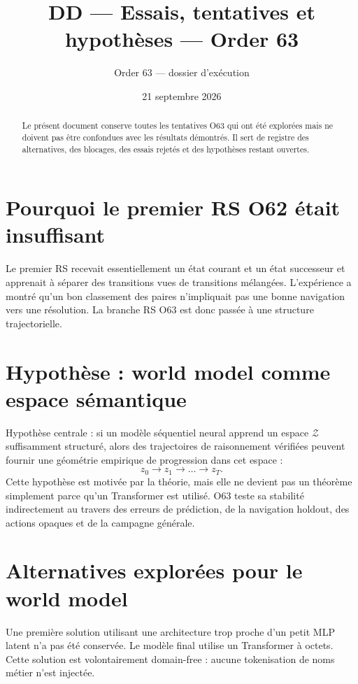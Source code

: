 \documentclass[11pt,a4paper]{article}
\newcommand{\Z}{\mathcal{Z}}
\begin{document}
\title{DD — Essais, tentatives et hypothèses — Order 63}\author{Order 63 — dossier d’exécution}\date{21 septembre 2026}\maketitle

\begin{abstract}
Le présent document conserve toutes les tentatives O63 qui ont été explorées mais ne doivent pas être confondues avec les résultats démontrés. Il sert de registre des alternatives, des blocages, des essais rejetés et des hypothèses restant ouvertes.
\end{abstract}

\section{Pourquoi le premier RS O62 était insuffisant}
Le premier RS recevait essentiellement un état courant et un état successeur et apprenait à séparer des transitions vues de transitions mélangées. L’expérience a montré qu’un bon classement des paires n’impliquait pas une bonne navigation vers une résolution. La branche RS O63 est donc passée à une structure trajectorielle.

\section{Hypothèse : world model comme espace sémantique}
Hypothèse centrale : si un modèle séquentiel neural apprend un espace $\Z$ suffisamment structuré, alors des trajectoires de raisonnement vérifiées peuvent fournir une géométrie empirique de progression dans cet espace :
\[
z_0\to z_1\to\dots\to z_T.
\]
Cette hypothèse est motivée par la théorie, mais elle ne devient pas un théorème simplement parce qu’un Transformer est utilisé. O63 teste sa stabilité indirectement au travers des erreurs de prédiction, de la navigation holdout, des actions opaques et de la campagne générale.

\section{Alternatives explorées pour le world model}
Une première solution utilisant une architecture trop proche d’un petit MLP latent n’a pas été conservée. Le modèle final utilise un Transformer à octets. Cette solution est volontairement domain-free : aucune tokenisation de noms métier n’est injectée.
\end{document}

